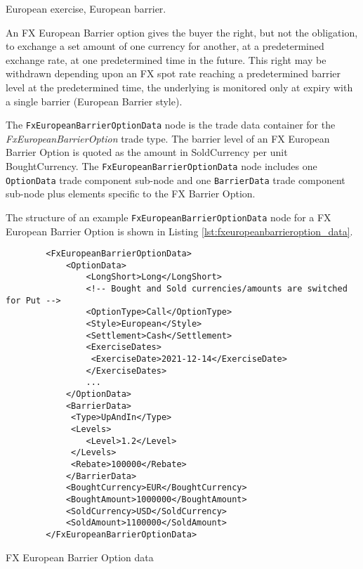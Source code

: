 \else

European exercise, European barrier.

An FX European Barrier option gives the buyer the right, but not the obligation, to
exchange a set amount of one currency for another, at a predetermined exchange rate,
at one predetermined time in the future. This right may be withdrawn depending upon
an FX spot rate reaching a predetermined barrier level at the predetermined time, the
underlying is monitored only at expiry with a single barrier (European Barrier style).

\fi

The \lstinline!FxEuropeanBarrierOptionData!  node is the trade data container for the \emph{FxEuropeanBarrierOption} trade type.    The barrier level of an FX European Barrier Option is quoted as the amount in SoldCurrency
per unit BoughtCurrency. The \lstinline!FxEuropeanBarrierOptionData!  node includes one  \lstinline!OptionData! trade component sub-node and one \lstinline!BarrierData! trade component sub-node plus elements
specific to the FX Barrier Option. 

The structure of an example \lstinline!FxEuropeanBarrierOptionData! node for a FX European Barrier Option is shown in Listing
\ref{lst:fxeuropeanbarrieroption_data}.

\begin{listing}[H]
\begin{verbatim}
        <FxEuropeanBarrierOptionData>
            <OptionData>
                <LongShort>Long</LongShort>
                <!-- Bought and Sold currencies/amounts are switched for Put -->
                <OptionType>Call</OptionType>
                <Style>European</Style>
                <Settlement>Cash</Settlement>                
                <ExerciseDates>
                 <ExerciseDate>2021-12-14</ExerciseDate>
                </ExerciseDates>
                ...
            </OptionData>
            <BarrierData>
             <Type>UpAndIn</Type>
             <Levels>
                <Level>1.2</Level>
             </Levels>
             <Rebate>100000</Rebate>            
            </BarrierData>
            <BoughtCurrency>EUR</BoughtCurrency>
            <BoughtAmount>1000000</BoughtAmount>
            <SoldCurrency>USD</SoldCurrency>
            <SoldAmount>1100000</SoldAmount>
        </FxEuropeanBarrierOptionData>
\end{verbatim}
\caption{FX European Barrier Option data}
\label{lst:fxeuropeanbarrieroption_data}
\end{listing}

